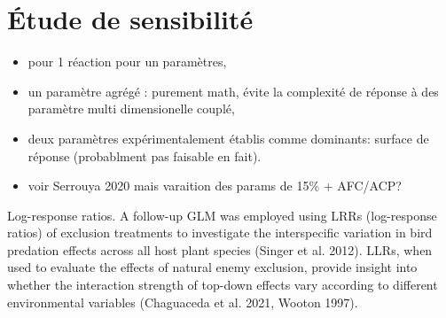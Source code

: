 \section{Étude de sensibilité }
\begin{itemize}
    \item pour 1 réaction pour un paramètres,
    \item un paramètre agrégé : purement math, évite la complexité de réponse à des paramètre multi dimensionelle couplé,
    \item deux paramètres expérimentalement établis comme dominants: surface de réponse (probablment pas faisable en fait).
    \item voir Serrouya 2020 mais varaition des params de 15\% + AFC/ACP?
\end{itemize}



Log-response ratios. A follow-up GLM was employed using LRRs (log-response ratios) of exclusion treatments to investigate the interspecific variation in bird predation effects across all host plant species (Singer et al. 2012). LLRs, when used to evaluate the effects of natural enemy exclusion, provide insight into whether the interaction strength of top-down effects vary according to different environmental variables (Chaguaceda et al. 2021, Wooton 1997). 